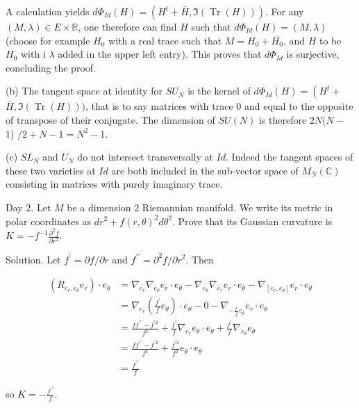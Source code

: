 \documentclass[10pt]{article}
\begin{document}
A calculation yields $d \Phi_{I d}(H)=\left(H^{t}+\bar{H}, \Im(\operatorname{Tr}(H))\right)$. For any $(M, \lambda) \in E \times \mathbb{R}$, one therefore can find $H$ such that $d \Phi_{I d}(H)=(M, \lambda)$ (choose for example $H_{0}$ with a real trace such that $M=H_{0}+\overline{H_{0}}$, and $H$ to be $H_{0}$ with i $\lambda$ added in the upper left entry). This proves that $d \Phi_{I d}$ is surjective, concluding the proof.

(b) The tangent space at identity for $S U_{N}$ is the kernel of $d \Phi_{I d}(H)=\left(H^{t}+\right.$ $\bar{H}, \Im(\operatorname{Tr}(H)))$, that is to say matrices with trace 0 and equal to the opposite of transpose of their conjugate. The dimension of $S U(N)$ is therefore $2 N(N-$ 1) $/ 2+N-1=N^{2}-1$.

(c) $S L_{N}$ and $U_{N}$ do not intersect transversally at $I d$. Indeed the tangent spaces of these two varieties at $I d$ are both included in the sub-vector space of $M_{N}(\mathbb{C})$ consisting in matrices with purely imaginary trace.

Day 2. Let $M$ be a dimension 2 Riemannian manifold. We write its metric in polar coordinates as $d r^{2}+f(r, \theta)^{2} d \theta^{2}$. Prove that its Gaussian curvature is
$K=-f^{-1} \frac{\partial^{2} f}{\partial r^{2}}$.

Solution. Let $f^{\prime}=\partial f / \partial r$ and $f^{\prime \prime}=\partial^{2} f / \partial r^{2}$. Then

$$
\begin{aligned}
\left(R_{e_{r}, e_{\theta}} e_{r}\right) \cdot e_{\theta} & =\nabla_{e_{r}} \nabla_{e_{\theta}} e_{r} \cdot e_{\theta}-\nabla_{e_{\theta}} \nabla_{e_{r}} e_{r} \cdot e_{\theta}-\nabla_{\left[e_{r}, e_{\theta}\right]} e_{r} \cdot e_{\theta} \\
& =\nabla_{e_{r}}\left(\frac{f^{\prime}}{f} e_{\theta}\right) \cdot e_{\theta}-0-\nabla_{-\frac{f^{\prime}}{f} e_{\theta}} e_{r} \cdot e_{\theta} \\
& =\frac{f f^{\prime \prime}-f^{\prime 2}}{f^{2}}+\frac{f^{\prime}}{f} \nabla_{e_{r}} e_{\theta} \cdot e_{\theta}+\frac{f^{\prime}}{f} \nabla_{e_{\theta}} e_{\theta} \\
& =\frac{f f^{\prime \prime}-f^{\prime 2}}{f^{2}}+\frac{f^{\prime 2}}{f^{2}} e_{\theta} \cdot e_{\theta} \\
& =\frac{f^{\prime \prime}}{f}
\end{aligned}
$$

so $K=-\frac{f^{\prime \prime}}{f}$.
\end{document}
